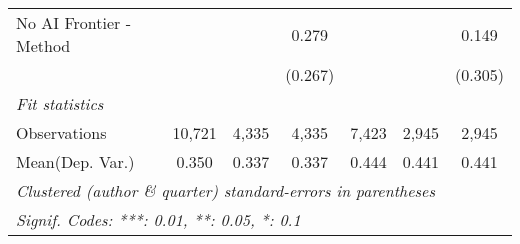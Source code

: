 \begin{tabular}{lcccccc}
   No AI Frontier - Method &               &             & 0.279        &               &              & 0.149\\   
                           &               &             & (0.267)      &               &              & (0.305)\\   
   \midrule
   \emph{Fit statistics}\\
   Observations            & 10,721        & 4,335       & 4,335        & 7,423         & 2,945        & 2,945\\  
Mean(Dep. Var.) & 0.350 & 0.337 & 0.337 & 0.444 & 0.441 & 0.441 \\
   \midrule \midrule
   \multicolumn{7}{l}{\emph{Clustered (author \& quarter) standard-errors in parentheses}}\\
   \multicolumn{7}{l}{\emph{Signif. Codes: ***: 0.01, **: 0.05, *: 0.1}}\\
\end{tabular}
\par\endgroup
